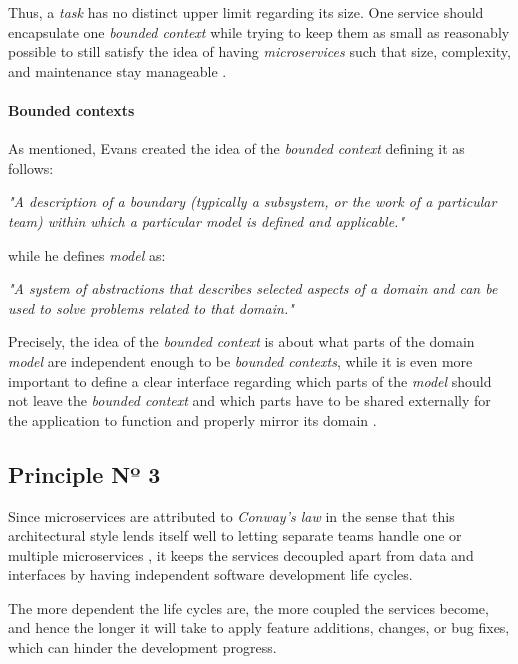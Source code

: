 \documentclass[12pt,a4paper]{report}
\begin{document}
Thus, a \textit{task} has no distinct upper limit regarding its size. One
service should encapsulate one \textit{bounded context} while trying to keep
them as small as reasonably possible to still satisfy the idea of having
\textit{microservices} such that size, complexity, and maintenance stay
manageable \cite{newman2015building, ms-fowler}.

\paragraph{Bounded contexts}
As mentioned, Evans created the idea of the
\textit{bounded context} defining it as follows:
\begin{displayquote}
  \emph{
  "A description of a boundary (typically a subsystem, or the work of a particular
  team) within which a particular model is defined and applicable."
  }~\cite{evans2014ddd}
\end{displayquote}
while he defines \textit{model} as:
\begin{displayquote}
  \emph{
  "A system of abstractions that describes selected aspects
  of a domain and can be used to solve problems related to that domain."
  }~\cite{evans2014ddd}
\end{displayquote}
Precisely, the idea of the \textit{bounded context} is about what parts
of the domain \textit{model} are independent
enough to be \textit{bounded contexts}, while it is even more important to
define a clear interface regarding which parts of the \textit{model} should not
leave the \textit{bounded context} and which parts have to be shared externally
for the application to function and properly mirror its domain
\cite{newman2015building}.


\subsection{Principle Nº 3}

Since microservices are attributed to \textit{Conway's law}
\cite{ms-fowler, dragoni2017microservices, conway1968law} in the
sense that this architectural style lends itself well to letting separate teams
handle one or multiple microservices \cite{newman2015building}, it keeps the
services decoupled apart from data and interfaces by having independent
software development life cycles.

The more dependent the life cycles are, the more coupled the services become,
and hence the longer it will take to apply feature additions, changes, or bug
fixes, which can hinder the development progress.
\end{document}
